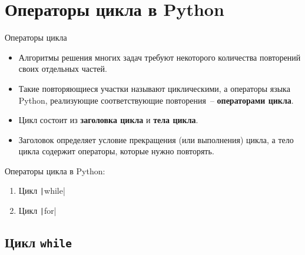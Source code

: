 \documentclass[aspectratio=169]{beamer}	%
\begin{document}
\section{Операторы цикла в Python}
\sectionframe


\begin{frame}[fragile]{Операторы цикла}
\scriptsize	
\begin{itemize}
	\item Алгоритмы решения многих задач требуют некоторого количества повторений своих отдельных частей.
	\item Такие повторяющиеся участки называют циклическими, а операторы языка Python, реализующие соответствующие повторения~-- \textcolor{extraorange}{\textbf{операторами цикла}}.
	\item Цикл состоит из \textcolor{extraorange}{\textbf{заголовка цикла}} и \textcolor{extraorange}{\textbf{тела цикла}}.
	\item Заголовок определяет условие прекращения (или выполнения) цикла, а тело цикла содержит операторы, которые нужно повторять.
\end{itemize}

\bigskip	
Операторы цикла в Python:
\begin{enumerate}
	\item Цикл \texttt|while|
	\item Цикл \texttt|for|
\end{enumerate}
\vfill
\end{frame}

\subsection{Цикл \texttt{while}}
\end{document}
